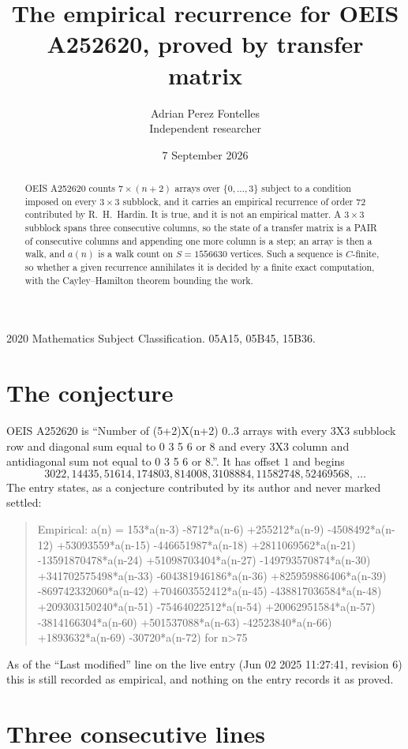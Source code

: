 \documentclass[11pt,a4paper]{article}
\title{The empirical recurrence for OEIS A252620, proved by transfer matrix}
\author{Adrian Perez Fontelles\\ \small Independent researcher}
\date{7 September 2026}
\theoremstyle{plain}
\theoremstyle{definition}
\begin{document}
\maketitle

\begin{abstract}
OEIS A252620 counts $7\times(n+2)$ arrays over $\{0,\dots,3\}$ subject to a condition imposed on
every $3\times3$ subblock, and it carries an empirical recurrence of order $72$
contributed by R.~H.~Hardin. It is true, and it is not an empirical matter. A $3\times3$
subblock spans three consecutive columns, so the state of a transfer matrix is a PAIR of
consecutive columns and appending one more column is a step; an array is then a walk, and
$a(n)$ is a walk count on $S=1556630$ vertices. Such a sequence is $C$-finite, so whether a given
recurrence annihilates it is decided by a finite exact computation, with the Cayley--Hamilton
theorem bounding the work.
\end{abstract}

\noindent\small 2020 Mathematics Subject Classification. 05A15, 05B45, 15B36.\normalsize

\section{The conjecture}

OEIS A252620 is ``Number of (5+2)X(n+2) 0..3 arrays with every 3X3 subblock row and diagonal sum equal to 0 3 5 6 or 8 and every 3X3 column and antidiagonal sum not equal to 0 3 5 6 or 8.''. It has offset $1$ and begins
\[
3022, 14435, 51614, 174803, 814008, 3108884, 11582748, 52469568,\ \dots
\]
The entry states, as a conjecture contributed by its author and never marked settled:
\begin{quote}
Empirical: a(n) = 153*a(n-3) -8712*a(n-6) +255212*a(n-9) -4508492*a(n-12) +53093559*a(n-15) -446651987*a(n-18) +2811069562*a(n-21) -13591870478*a(n-24) +51098703404*a(n-27) -149793570874*a(n-30) +341702575498*a(n-33) -604381946186*a(n-36) +825959886406*a(n-39) -869742332060*a(n-42) +704603552412*a(n-45) -438817036584*a(n-48) +209303150240*a(n-51) -75464022512*a(n-54) +20062951584*a(n-57) -3814166304*a(n-60) +501537088*a(n-63) -42523840*a(n-66) +1893632*a(n-69) -30720*a(n-72) for n>75
\end{quote}
As of the ``Last modified'' line on the live entry (Jun 02 2025 11:27:41, revision 6) this is still
recorded as empirical, and nothing on the entry records it as proved.

\section{Three consecutive lines}
\end{document}
